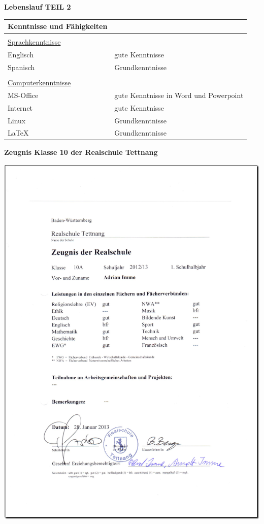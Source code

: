 \documentclass[12pt, german]{g-brief}
\begin{document}
 \newpage
 
\begin{Large}
{\bfseries Lebenslauf TEIL 2}
\end{Large}


\vspace{1cm}
 \begin{tabular}{l p{9.4cm}}
 {\bf Kenntnisse und Fähigkeiten} & \\
\hline
 & \\
{\underline {Sprachkenntnisse}} & \\
Englisch & gute Kenntnisse  \\
Spanisch & Grundkenntnisse  \\
 & \\
{\underline {Computerkenntnisse}} & \\
MS-Office & gute Kenntnisse in Word und Powerpoint \\
Internet & gute Kenntnisse \\
Linux & Grundkenntnisse \\
\LaTeX & Grundkenntnisse \\

\end{tabular}


\newpage


\begin{Large}
{\bfseries Zeugnis Klasse 10 der Realschule Tettnang}
\end{Large}

\includegraphics[width=1\textwidth]{pictures/Zeugnis_10}
\end{document}
